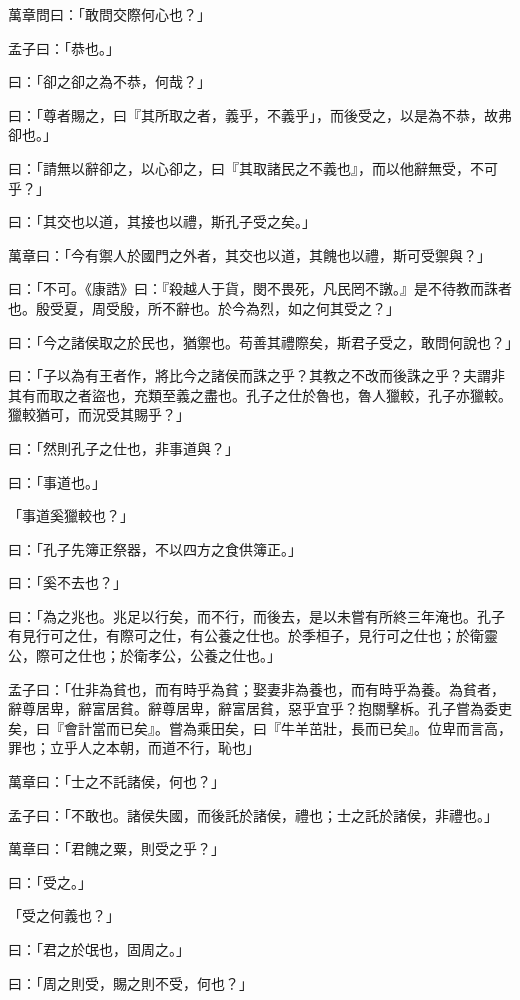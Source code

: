 \documentclass[12pt,a4paper]{ctexbook}
\begin{document}
萬章問曰：「敢問交際何心也？」\par
孟子曰：「恭也。」\par
曰：「卻之卻之為不恭，何哉？」\par
曰：「尊者賜之，曰『其所取之者，義乎，不義乎」，而後受之，以是為不恭，故弗卻也。」\par
曰：「請無以辭卻之，以心卻之，曰『其取諸民之不義也』，而以他辭無受，不可乎？」\par
曰：「其交也以道，其接也以禮，斯孔子受之矣。」\par
萬章曰：「今有禦人於國門之外者，其交也以道，其餽也以禮，斯可受禦與？」\par
曰：「不可。《康誥》曰：『殺越人于貨，閔不畏死，凡民罔不譈。』是不待教而誅者也。殷受夏，周受殷，所不辭也。於今為烈，如之何其受之？」\par
曰：「今之諸侯取之於民也，猶禦也。苟善其禮際矣，斯君子受之，敢問何說也？」\par
曰：「子以為有王者作，將比今之諸侯而誅之乎？其教之不改而後誅之乎？夫謂非其有而取之者盜也，充類至義之盡也。孔子之仕於魯也，魯人獵較，孔子亦獵較。獵較猶可，而況受其賜乎？」\par
曰：「然則孔子之仕也，非事道與？」\par
曰：「事道也。」\par
「事道奚獵較也？」\par
曰：「孔子先簿正祭器，不以四方之食供簿正。」\par
曰：「奚不去也？」\par
曰：「為之兆也。兆足以行矣，而不行，而後去，是以未嘗有所終三年淹也。孔子有見行可之仕，有際可之仕，有公養之仕也。於季桓子，見行可之仕也；於衛靈公，際可之仕也；於衛孝公，公養之仕也。」\par
孟子曰：「仕非為貧也，而有時乎為貧；娶妻非為養也，而有時乎為養。為貧者，辭尊居卑，辭富居貧。辭尊居卑，辭富居貧，惡乎宜乎？抱關擊柝。孔子嘗為委吏矣，曰『會計當而已矣』。嘗為乘田矣，曰『牛羊茁壯，長而已矣』。位卑而言高，罪也；立乎人之本朝，而道不行，恥也」\par
萬章曰：「士之不託諸侯，何也？」\par
孟子曰：「不敢也。諸侯失國，而後託於諸侯，禮也；士之託於諸侯，非禮也。」\par
萬章曰：「君餽之粟，則受之乎？」\par
曰：「受之。」\par
「受之何義也？」\par
曰：「君之於氓也，固周之。」\par
曰：「周之則受，賜之則不受，何也？」\par
\end{document}
